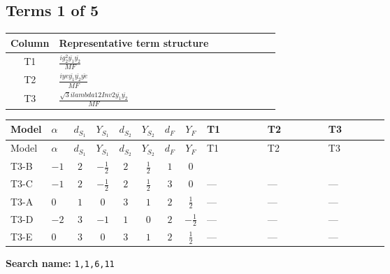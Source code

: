 \documentclass[8pt]{article}
\begin{document}
\begin{landscape}
\subsection*{Terms 1 of 5}
\begin{center}
\begin{tabular}{@{}c >{\raggedright\arraybackslash}p{0.82\linewidth}@{}}
\toprule
Column & Representative term structure \\
\midrule
T1 & \(\displaystyle \frac{i g_{2}^{2} \overline{y_{1}} \overline{y_{2}}}{MF}\) \\
\midrule
T2 & \(\displaystyle \frac{i ye \overline{y_{1}} \overline{y_{2}} \overline{ye}}{MF}\) \\
\midrule
T3 & \(\displaystyle \frac{\sqrt{3} i lambda12Inv2 \overline{y_{1}} \overline{y_{2}}}{MF}\) \\
\midrule
\bottomrule
\end{tabular}
\end{center}
\smallskip
\tiny
\begin{longtable}{@{}llcccccc >{\raggedright\arraybackslash}p{0.21\linewidth} >{\raggedright\arraybackslash}p{0.21\linewidth} >{\raggedright\arraybackslash}p{0.21\linewidth}@{}}
\toprule
Model & $\alpha$ & $d_{S_1}$ & $Y_{S_1}$ & $d_{S_2}$ & $Y_{S_2}$ & $d_F$ & $Y_F$ & T1 & T2 & T3 \\
\midrule
\endfirsthead
\toprule
Model & $\alpha$ & $d_{S_1}$ & $Y_{S_1}$ & $d_{S_2}$ & $Y_{S_2}$ & $d_F$ & $Y_F$ & T1 & T2 & T3 \\
\midrule
\endhead
T3-B & $-1$ & $2$ & $-\frac{1}{2}$ & $2$ & $\frac{1}{2}$ & $1$ & $0$ & \scriptsize\adjustbox{max width=\linewidth}{$\begin{gathered} \frac{3 i g_{2}^{2} \overline{y_{1}} \overline{y_{2}}}{4 MF}\end{gathered}$} & \scriptsize\adjustbox{max width=\linewidth}{$\begin{gathered} - \frac{i ye \overline{y_{1}} \overline{y_{2}} \overline{ye}}{4 MF}\end{gathered}$} & \scriptsize\adjustbox{max width=\linewidth}{$\begin{gathered} \frac{\sqrt{3} i lambda12Inv2 \overline{y_{1}} \overline{y_{2}}}{3 MF}\end{gathered}$} \\
\midrule
T3-C & $-1$ & $2$ & $-\frac{1}{2}$ & $2$ & $\frac{1}{2}$ & $3$ & $0$ & --- & --- & --- \\
\midrule
T3-A & $0$ & $1$ & $0$ & $3$ & $1$ & $2$ & $\frac{1}{2}$ & --- & --- & --- \\
\midrule
T3-D & $-2$ & $3$ & $-1$ & $1$ & $0$ & $2$ & $-\frac{1}{2}$ & --- & --- & --- \\
\midrule
T3-E & $0$ & $3$ & $0$ & $3$ & $1$ & $2$ & $\frac{1}{2}$ & --- & --- & --- \\
\midrule
\bottomrule
\end{longtable}
\clearpage
\noindent\textbf{Search name: }\texttt{1,1,6,11}\par\smallskip

\end{landscape}
\end{document}
